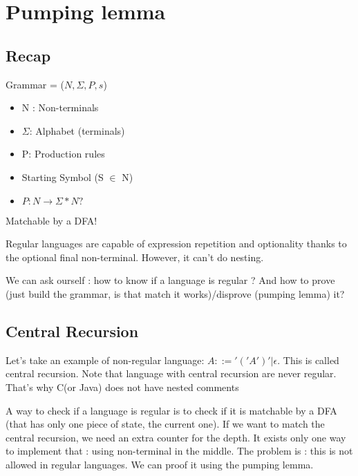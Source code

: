 \chapter{Pumping lemma}
\label{chap:pumping_lemma}

\section{Recap}
\theoremstyle{definition}
\begin{definition}[Grammar]
    Grammar = ($N, \Sigma, P, s$)
    \begin{itemize}
        \item N : Non-terminals
        \item $\Sigma$: Alphabet (terminals)
        \item P: Production rules
        \item Starting Symbol (S $\in$ N)
        \item $P: N \rightarrow \Sigma * N?$
    \end{itemize}
    Matchable by a DFA!
\end{definition}

Regular languages are capable of expression repetition and optionality thanks to
the optional final non-terminal. However, it can't do nesting.

We can ask ourself : how to know if a language is regular ? 
And how to prove (just build the grammar, is that match it works)/disprove (pumping lemma) it?
\section{Central Recursion}
    Let's take an example of non-regular language: $A ::= '('A')' | \epsilon$.
    This is called central recursion. Note that language with central recursion
    are never regular. That's why C(or Java) does not have nested comments

    A way to check if a language is regular is to check if it is matchable by a
    DFA (that has only one piece of state, the current one). If we want to match
    the central recursion, we need an extra counter for the depth. It exists
    only one way to implement that : using non-terminal in the middle. The
    problem is : this is not allowed in regular languages. We can proof it using
    the pumping lemma.
\newpage
